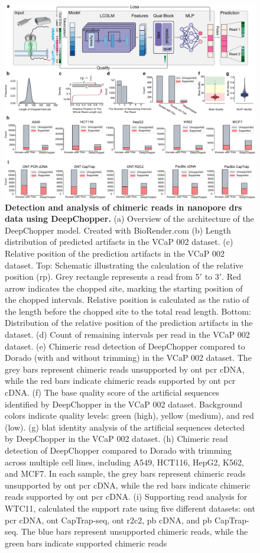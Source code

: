 \documentclass[pdflatex,sn-nature, lineno]{sn-jnl}%
\theoremstyle{thmstyleone}%
\theoremstyle{thmstyletwo}%
\theoremstyle{thmstylethree}%
\begin{document}
\begin{figure}[!h]
	\includegraphics[height=0.78\columnwidth]{finals/figure1}
	\caption{{\bf  Detection and analysis of chimeric reads in nanopore \gls{drs} data using DeepChopper.} (a) Overview of the architecture of the DeepChopper model. Created with BioRender.com (b) Length distribution of predicted artifacts in the VCaP 002 dataset. (c) Relative position of the prediction artifacts in the VCaP 002 dataset. Top: Schematic illustrating the calculation of the relative position (rp). Grey rectangle represents a read from 5$'$ to 3$'$. Red arrow indicates the chopped site, marking the starting position of the chopped intervals. Relative position is calculated as the ratio of the length before the chopped site to the total read length. Bottom: Distribution of the relative position of the prediction artifacts in the dataset. (d) Count of remaining intervals per read in the VCaP 002 dataset. (e) Chimeric read detection of DeepChopper compared to Dorado (with and without trimming) in the VCaP 002 dataset. The grey bars represent chimeric reads unsupported by \gls{ont} \gls{pcr} cDNA, while the red bars indicate chimeric reads supported by \gls{ont} \gls{pcr} cDNA.  (f) The base quality score of the artificial sequences identified by DeepChopper in the VCaP 002 dataset. Background colors indicate quality levels: green (high), yellow (medium), and red (low). (g) \gls{blat} identity analysis of the artificial sequences detected by DeepChopper in the VCaP 002 dataset. (h) Chimeric read detection of DeepChopper compared to Dorado with trimming across multiple cell lines, including A549, HCT116, HepG2, K562, and MCF7. In each sample, the grey bars represent chimeric reads unsupported by \gls{ont} \gls{pcr} cDNA, while the red bars indicate chimeric reads supported by \gls{ont} \gls{pcr} cDNA. (i)  Supporting read analysis for WTC11, calculated the support rate using five different datasets: \gls{ont} \gls{pcr} cDNA, \gls{ont} CapTrap-seq, \gls{ont} \gls{r2c2}, \gls{pb} cDNA, and \gls{pb} CapTrap-seq. The blue bars represent unsupported chimeric reads, while the green bars indicate supported chimeric reads}\label{fig:f1}
\end{figure}
\end{document}
